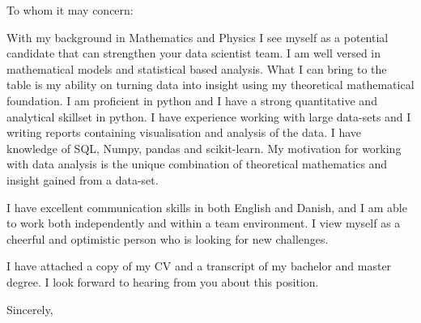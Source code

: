 \documentclass[10pt,a4paper]{letter}
\begin{document}
\begin{letter}{}
\opening{To whom it may concern:}

With my background in Mathematics and Physics I see myself as a potential candidate that can strengthen your data scientist team. I am well versed in mathematical models and statistical based analysis. What I can bring to the table is my ability on turning data into insight using my theoretical mathematical foundation. I am proficient in python and I have a strong quantitative and analytical skillset in python. I have experience working with large data-sets and I writing reports containing visualisation and analysis of the data.  I have knowledge of SQL, Numpy, pandas and scikit-learn. My motivation for working with data analysis is the unique combination of theoretical mathematics and insight gained from a data-set.    
 
I have excellent communication skills in both English and Danish, and I am able to work both independently and within a team environment. I view myself as a cheerful and optimistic person who is looking for new challenges.

I have attached a copy of my CV and a transcript of my bachelor and master degree. I look forward to hearing from you about this position.   

\closing{Sincerely,}

\end{letter}

\end{document}
